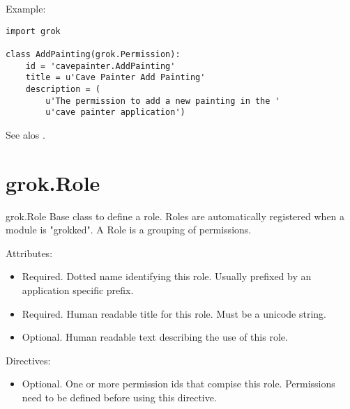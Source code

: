   \begin{bf}Example:\end{bf}

  \begin{verbatim}
import grok

class AddPainting(grok.Permission):
    id = 'cavepainter.AddPainting'
    title = u'Cave Painter Add Painting'
    description = (
        u'The permission to add a new painting in the '
        u'cave painter application')
  \end{verbatim}

  \begin{seealso}
  See alos .
  \end{seealso}

\section{grok.Role}

  \begin{classdesc*}{grok.Role}
    Base class to define a role. Roles are automatically registered when a
    module is "grokked". A Role is a grouping of permissions.

  \begin{bf}Attributes:\end{bf}

  \begin{itemize}
    \item[\function{id(dotted_name)}] Required. Dotted name identifying this
      role. Usually prefixed by an application specific prefix.

    \item[\function{title(name)}] Required. Human readable title for this
      role. Must be a unicode string.

    \item[\function{description(text)}] Optional. Human readable text
      describing the use of this role.
  \end{itemize}

  \begin{bf}Directives:\end{bf}

  \begin{itemize}
    \item[\function{grok.permissions(*permission_ids)}] Optional. One or more
      permission ids that compise this role. Permissions need to be defined
      before using this directive.
  \end{itemize}
  \end{classdesc*}

